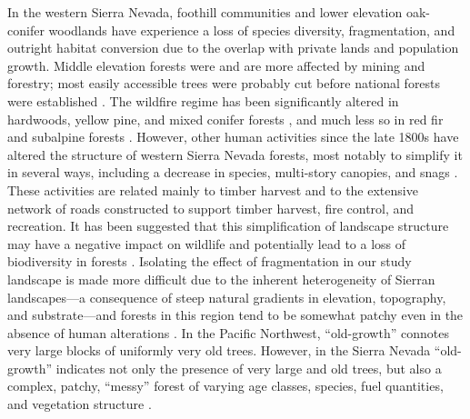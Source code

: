 In the western Sierra Nevada, foothill communities and lower elevation oak-conifer woodlands have experience a loss of species diversity, fragmentation, and outright habitat conversion due to the overlap with private lands and population growth. Middle elevation forests were and are more affected by mining and forestry; most easily accessible trees were probably cut before national forests were established \citep{SNEP1996}. The wildfire regime has been significantly altered in hardwoods, yellow pine, and mixed conifer forests \citep{Merriam2013,Safford2013}, and much less so in red fir and subalpine forests \citep{Meyer2013,Meyer2013a}. However, other human activities since the late 1800s have altered the structure of western Sierra Nevada forests, most notably to simplify it in several ways, including a decrease in species, multi-story canopies, and snags \citep{SNEP1996}. These activities are related mainly to timber harvest and to the extensive network of roads constructed to support timber harvest, fire control, and recreation. It has been suggested that this simplification of landscape structure may have a negative impact on wildlife and potentially lead to a loss of biodiversity in forests \citep{Thompson2003,Manley2004,Hunter2011}. Isolating the effect of fragmentation in our study landscape is made more difficult due to the inherent heterogeneity of Sierran landscapes---a consequence of steep natural gradients in elevation, topography, and substrate---and forests in this region tend to be somewhat patchy even in the absence of human alterations \citep{Franklin1996}. In the Pacific Northwest, ``old-growth'' connotes very large blocks of uniformly very old trees. However, in the Sierra Nevada ``old-growth'' indicates not only the presence of very large and old trees, but also a complex, patchy, ``messy'' forest of varying age classes, species, fuel quantities, and vegetation structure \citep{SNEP1996}.




